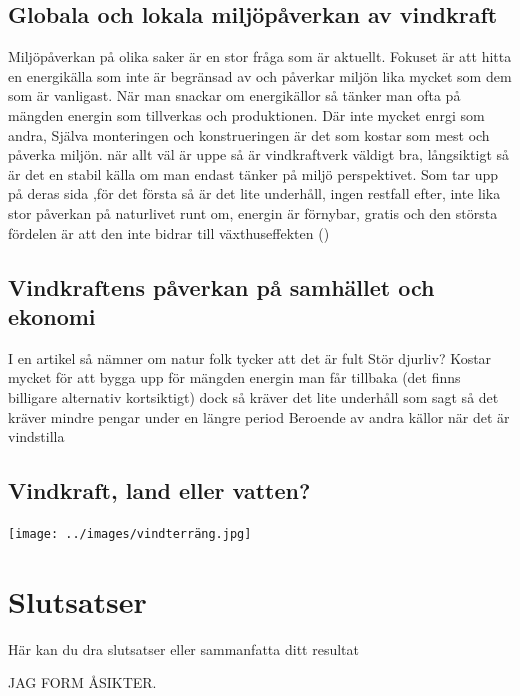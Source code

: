 \documentclass[11p]{article}
\begin{document}
    \subsection{Globala och lokala miljöpåverkan av vindkraft}
    Miljöpåverkan på olika saker är en stor fråga som är aktuellt.
    Fokuset är att hitta en energikälla som inte är begränsad av och påverkar miljön lika mycket som dem som är vanligast.
    När man snackar om energikällor så tänker man ofta på mängden energin som tillverkas och produktionen.
    Där inte mycket enrgi som andra,
    Själva monteringen och konstrueringen är det som kostar som mest och påverka miljön.
    när allt väl är uppe så är vindkraftverk väldigt bra, långsiktigt så är det en stabil källa om man endast tänker på miljö perspektivet.
    Som \parencite{ugglansfysik} tar upp på deras sida ,för det första så är det lite underhåll, ingen restfall efter, inte lika stor påverkan på naturlivet runt om, energin är förnybar, gratis och den största fördelen är att den inte bidrar till växthuseffekten ()


    \subsection{Vindkraftens påverkan på samhället och ekonomi}
   I en artikel så nämner \textcite{divaportal} om
    natur folk tycker att det är fult
    Stör djurliv?
    Kostar mycket för att bygga upp för mängden energin man får tillbaka (det finns billigare alternativ kortsiktigt)
    dock så kräver det lite underhåll som sagt så det kräver mindre pengar under en längre period
   Beroende av andra källor när det är vindstilla
    \subsection{Vindkraft, land eller vatten?}

    \texttt{[image: ../images/vindterräng.jpg]}

    \subsection{}

    \section{Slutsatser}
    Här kan du dra slutsatser eller sammanfatta ditt resultat

    JAG FORM ÅSIKTER.

\end{document}
